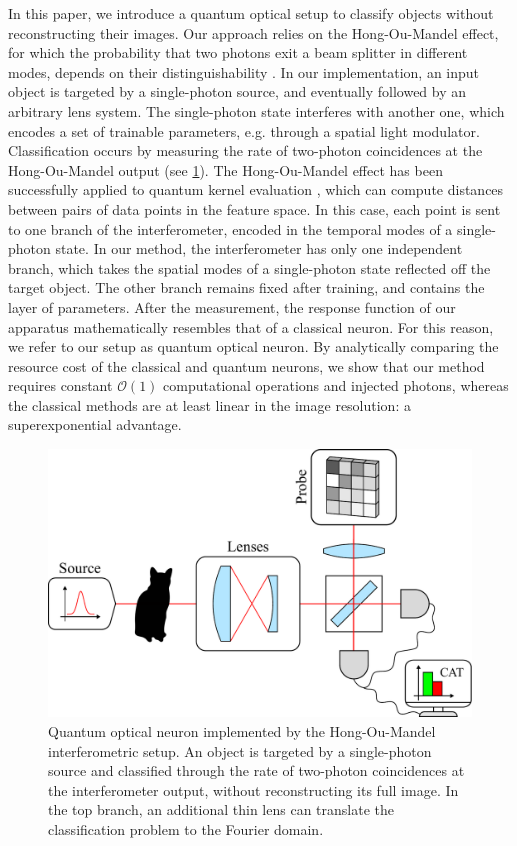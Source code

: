 \documentclass[reprint,
superscriptaddress,
nofootinbib,
aps,
pra,
showkeys
]{revtex4-2}
\begin{document}
In this paper, we introduce a quantum optical setup to classify objects without reconstructing their images. Our approach relies on the Hong-Ou-Mandel effect, for which the probability that two photons exit a beam splitter in different modes, depends on their distinguishability \citep{art:Mandel}. In our implementation, an input object is targeted by a single-photon source, and eventually followed by an arbitrary lens system. The single-photon state interferes with another one, which encodes a set of trainable parameters, e.g. through a spatial light modulator. Classification occurs by measuring the rate of two-photon coincidences at the Hong-Ou-Mandel output (see \cref{fig:Setup}). The Hong-Ou-Mandel effect has been successfully applied to quantum kernel evaluation \citep{art:Bowie}, which can compute distances between pairs of data points in the feature space. In this case, each point is sent to one branch of the interferometer, encoded in the temporal modes of a single-photon state. In our method, the interferometer has only one independent branch, which takes the spatial modes of a single-photon state reflected off the target object. The other branch remains fixed after training, and contains the layer of parameters. After the measurement, the response function of our apparatus mathematically resembles that of a classical neuron. For this reason, we refer to our setup as quantum optical neuron. By analytically comparing the resource cost of the classical and quantum neurons, we show that our method requires constant $\mathcal{O}(1)$ computational operations and injected photons, whereas the classical methods are at least linear in the image resolution: a superexponential advantage.
\begin{figure}[b]
	\centering
	\includegraphics[width = 0.4 \textwidth]{Setup.pdf}%
	\caption{\label{fig:Setup}Quantum optical neuron implemented by the Hong-Ou-Mandel interferometric setup. An object is targeted by a single-photon source and classified through the rate of two-photon coincidences at the interferometer output, without reconstructing its full image. In the top branch, an additional thin lens can translate the classification problem to the Fourier domain.}
\end{figure}
\end{document}
